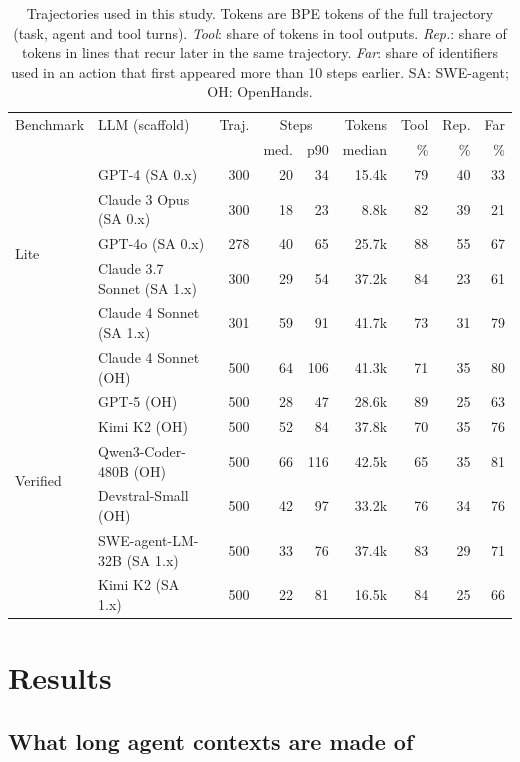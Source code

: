 \begin{table}[t]
\centering
\small
\caption{Trajectories used in this study. Tokens are BPE tokens of the full
trajectory (task, agent and tool turns). \emph{Tool}: share of tokens in tool
outputs. \emph{Rep.}: share of tokens in lines that recur later in the same
trajectory. \emph{Far}: share of identifiers used in an action that first
appeared more than 10 steps earlier. SA: SWE-agent; OH: OpenHands.}
\label{tab:corpus}
\setlength{\tabcolsep}{4pt}
\begin{tabular}{llrrrrrrr}
\toprule
Benchmark & LLM (scaffold) & Traj. & \multicolumn{2}{c}{Steps} & Tokens & Tool & Rep. & Far \\
 & & & med. & p90 & median & \% & \% & \% \\
\midrule
\multirow{5}{*}{Lite} & GPT-4 (SA 0.x) & 300 & 20 & 34 & 15.4k & 79 & 40 & 33 \\
 & Claude 3 Opus (SA 0.x) & 300 & 18 & 23 & 8.8k & 82 & 39 & 21 \\
 & GPT-4o (SA 0.x) & 278 & 40 & 65 & 25.7k & 88 & 55 & 67 \\
 & Claude 3.7 Sonnet (SA 1.x) & 300 & 29 & 54 & 37.2k & 84 & 23 & 61 \\
 & Claude 4 Sonnet (SA 1.x) & 301 & 59 & 91 & 41.7k & 73 & 31 & 79 \\
\midrule
\multirow{7}{*}{Verified} & Claude 4 Sonnet (OH) & 500 & 64 & 106 & 41.3k & 71 & 35 & 80 \\
 & GPT-5 (OH) & 500 & 28 & 47 & 28.6k & 89 & 25 & 63 \\
 & Kimi K2 (OH) & 500 & 52 & 84 & 37.8k & 70 & 35 & 76 \\
 & Qwen3-Coder-480B (OH) & 500 & 66 & 116 & 42.5k & 65 & 35 & 81 \\
 & Devstral-Small (OH) & 500 & 42 & 97 & 33.2k & 76 & 34 & 76 \\
 & SWE-agent-LM-32B (SA 1.x) & 500 & 33 & 76 & 37.4k & 83 & 29 & 71 \\
 & Kimi K2 (SA 1.x) & 500 & 22 & 81 & 16.5k & 84 & 25 & 66 \\
\bottomrule
\end{tabular}
\end{table}

\section{Results}
\label{sec:results}

\subsection{What long agent contexts are made of}
\label{sec:corpus}

